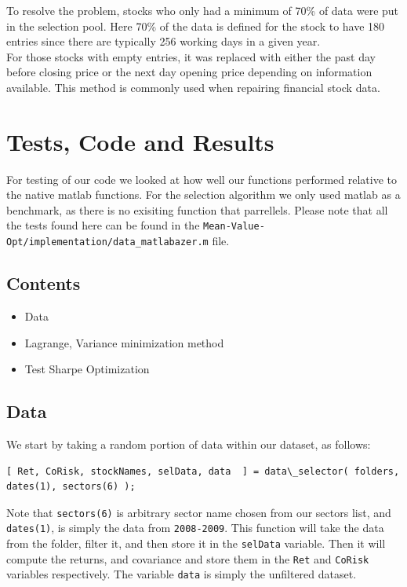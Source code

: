 \documentclass[12pt,titlepage,a4paper]{article}
\begin{document}
To resolve the problem, stocks who only had a minimum of 70\% of data were put in the selection pool. Here 70\% of the data is defined for the stock to have 180 entries since there are typically 256 working days in a given year.\\

For those stocks with empty entries, it was replaced with either the past day before closing price or the next day opening price depending on information available. This method is commonly used when repairing financial stock data.  


\section{Tests, Code and Results}

\begin{par}
For testing of our code we looked at how well our functions performed relative to the native matlab functions. For the selection algorithm we only used matlab as a benchmark, as there is no exisiting function that parrellels. Please note that all the tests found here can be found in the \texttt{Mean-Value-Opt/implementation/data\_matlabazer.m} file.
\end{par} \vspace{1em}

\subsection*{Contents}

\begin{itemize}
\setlength{\itemsep}{-1ex}
   \item Data
   \item Lagrange, Variance minimization method
   \item Test Sharpe Optimization
\end{itemize}


\subsection*{Data}

\begin{par}
We start by taking a random portion of data within our dataset, as follows:
\end{par} \vspace{1em}
\begin{verbatim}[ Ret, CoRisk, stockNames, selData, data  ] = data\_selector( folders,  dates(1), sectors(6) );\end{verbatim}
\begin{par}
Note that \texttt{sectors(6)} is arbitrary sector name chosen from our sectors list, and \texttt{dates(1)}, is simply the data from \texttt{2008-2009}. This function will take the data from the folder, filter it, and then store it in the \texttt{selData} variable. Then it will compute the returns, and covariance and store them in the \texttt{Ret} and \texttt{CoRisk} variables respectively. The variable \texttt{data} is simply the unfiltered dataset.
\end{par} \vspace{1em}
\end{document}
